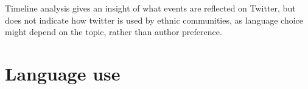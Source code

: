\documentclass[11pt,a4paper]{article}
\begin{document}

Timeline analysis gives an insight of what events are reflected on Twitter, but does not indicate how twitter is used by ethnic communities, as language choice might depend on the topic, rather than author preference.

\section{Language use}
\label{sec:lang-use}





\end{document}
